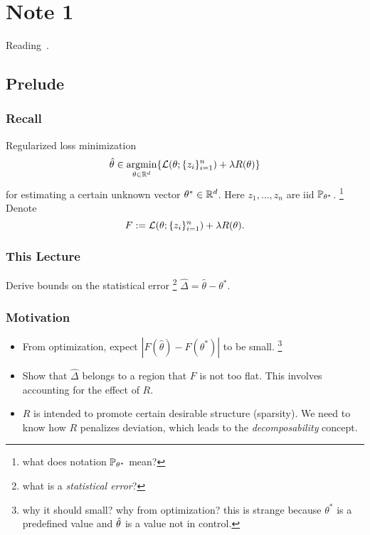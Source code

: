 \section{Note 1}
Reading~\cite{negahban2012}.
\subsection{Prelude}

\subsubsection{Recall}

Regularized loss minimization
\begin{equation}
\hat\theta \in \mathop{\mathrm{argmin}}_{\theta\in{\mathbb{R}}^d} \{\mathcal{L}(\theta;\{z_i\}_{i=1}^n) + \lambda R(\theta)\}
\end{equation}
for estimating a certain unknown vector $\theta^*\in{\mathbb{R}}^d$.
Here $z_1,\dots,z_n$ are iid \wrt $\mathbb{P}_{\theta^*}$.
\footnote{what does notation $\mathbb{P}_{\theta^*}$ mean?}
Denote
\begin{equation}
F := \mathcal{L}(\theta;\{z_i\}_{i=1}^n) + \lambda R(\theta).
\end{equation}

\subsubsection{This Lecture}

Derive bounds on the statistical error
\footnote{what is a \emph{statistical error}?}
$\hat\Delta = \hat\theta - \theta^*$.

\subsubsection{Motivation}

\begin{itemize}
    \item From optimization, expect
        $|F(\hat\theta) - F(\theta^*)|$
        to be small.
        \footnote{why it should small? why from optimization?
        this is strange because $\theta^*$ is a predefined value and
        ${\hat{\theta}}$ is a value not in control.}
    \item Show that $\hat\Delta$ belongs to a region
        that $F$ is not too flat.
        This involves accounting for the effect of $R$.
    \item $R$ is intended to promote certain desirable structure (\eg sparsity).
        We need to know how $R$ penalizes deviation,
        which leads to the \emph{decomposability} concept.
\end{itemize}

